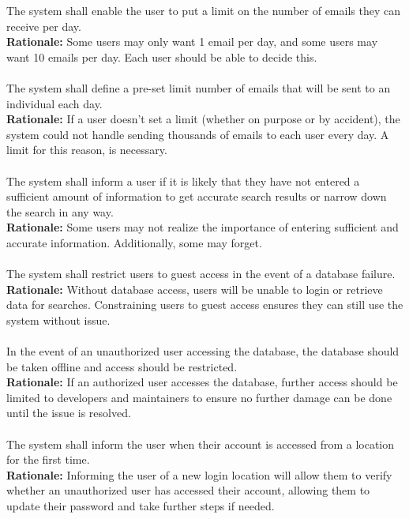 \documentclass{article}
\begin{document}
The system shall enable the user to put a limit on the number of emails they can receive per day.\\
\textbf{Rationale:}
Some users may only want 1 email per day, and some users may want 10 emails per day. Each user should be able to decide this.\\~\\

The system shall define a pre-set limit number of emails that will be sent to an individual each day.\\
\textbf{Rationale:}
If a user doesn't set a limit (whether on purpose or by accident), the system could not handle sending thousands of emails to each user every day. A limit for this reason, is necessary.\\~\\

The system shall inform a user if it is likely that they have not entered a sufficient amount of information to get accurate search results or narrow down the search in any way.\\
\textbf{Rationale:}
Some users may not realize the importance of entering sufficient and accurate information. Additionally, some may forget.\\~\\

The system shall restrict users to guest access in the event of a database failure.\\
\textbf{Rationale:}
Without database access, users will be unable to login or retrieve data for searches. Constraining users to guest access ensures they can still use the system without issue.\\~\\

In the event of an unauthorized user accessing the database, the database should be taken offline and access should be restricted.\\
\textbf{Rationale:}
If an authorized user accesses the database, further access should be limited to developers and maintainers to ensure no further damage can be done until the issue is resolved.\\~\\

The system shall inform the user when their account is accessed from a location for the first time. \\
\textbf{Rationale:}
Informing the user of a new login location will allow them to verify whether an unauthorized user has accessed their account, allowing them to update their password and take further steps if needed. \\~\\
\end{document}
